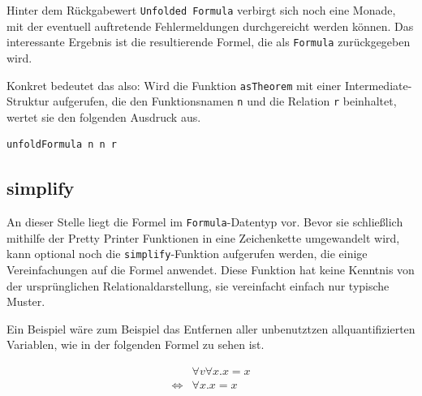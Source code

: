 Hinter dem Rückgabewert \texttt{Unfolded Formula} verbirgt sich noch eine Monade, mit der eventuell auftretende Fehlermeldungen
durchgereicht werden können. Das interessante Ergebnis ist die resultierende Formel, die als \texttt{Formula} zurückgegeben wird.

Konkret bedeutet das also: Wird die Funktion \texttt{asTheorem} mit einer Intermediate-Struktur aufgerufen, die den
Funktionsnamen \texttt{n} und die Relation \texttt{r} beinhaltet, wertet sie den folgenden Ausdruck aus.

\begin{verbatim}
unfoldFormula n n r
\end{verbatim}


%


\subsection{simplify}

An dieser Stelle liegt die Formel im \texttt{Formula}-Datentyp vor. Bevor sie schließlich mithilfe der Pretty Printer Funktionen
in eine Zeichenkette umgewandelt wird, kann optional noch die \texttt{simplify}-Funktion aufgerufen werden, die einige
Vereinfachungen auf die Formel anwendet. Diese Funktion hat keine Kenntnis von der ursprünglichen Relationaldarstellung, sie
vereinfacht einfach nur typische Muster.

Ein Beispiel wäre zum Beispiel das Entfernen aller unbenutztzen allquantifizierten Variablen, wie in der folgenden Formel zu sehen
ist.

\begin{align*}
& \forall v \forall x . x = x \\
\Leftrightarrow & \forall x . x = x 
\end{align*}

